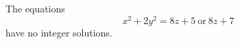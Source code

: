 \begin{proposition}
    The equations
\[
    x^2+2y^2=8z+5\ \text{or}\ 8z+7
\]
    have no integer solutions.
\end{proposition}
